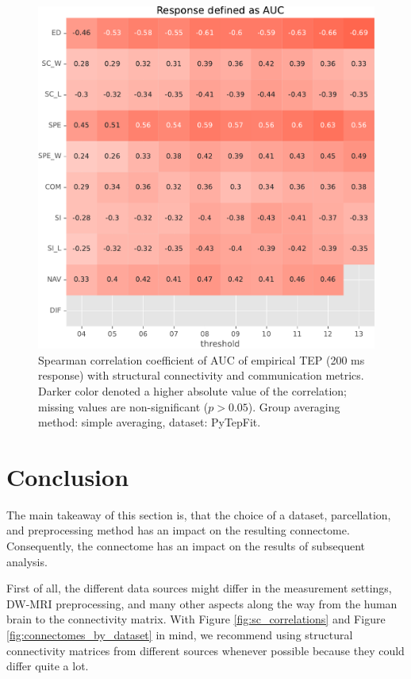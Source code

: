 \begin{figure}
    \centering
    \includegraphics[width=\textwidth]{images/nootebook_generated/tmseeg_results/empirical/200/not_over_threshold_nan/PyTepFit_simple/Response defined as AUC.pdf}
    \caption[TEPs AUC (200 ms) correlations (PyTepFit)]{Spearman correlation coefficient of AUC of empirical TEP (200 ms response) with structural connectivity and communication metrics. Darker color denoted a higher absolute value of the correlation; missing values are non-significant ($p>0.05$). Group averaging method: simple averaging, dataset: PyTepFit.}
    \label{fig:tms_auc_200_pytep_simple}
\end{figure}


\section{Conclusion}

The main takeaway of this section is, that the choice of a dataset, parcellation, and preprocessing method has an impact on the resulting connectome. Consequently, the connectome has an impact on the results of subsequent analysis.

First of all, the different data sources might differ in the measurement settings, DW-MRI preprocessing, and many other aspects along the way from the human brain to the connectivity matrix. With Figure \ref{fig:sc_correlations} and Figure \ref{fig:connectomes_by_dataset} in mind, we recommend using structural connectivity matrices from different sources whenever possible because they could differ quite a lot.

